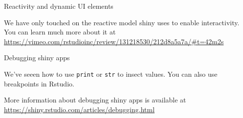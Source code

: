 \documentclass[
  12pt,
  ignorenonframetext,
]{beamer}
\begin{document}
\begin{frame}{Reactivity and dynamic UI elements}
\protect\hypertarget{reactivity-and-dynamic-ui-elements}{}

We have only touched on the reactive model shiny uses to enable
interactivity. You can learn much more about it at
\url{https://vimeo.com/rstudioinc/review/131218530/212d8a5a7a/\#t=42m2s}

\end{frame}

\begin{frame}[fragile]{Debugging shiny apps}
\protect\hypertarget{debugging-shiny-apps}{}

We've seeen how to use \texttt{print} or \texttt{str} to insect values.
You can also use breakpoints in Rstudio.

More information about debugging shiny apps is available at
\url{https://shiny.rstudio.com/articles/debugging.html}

\end{frame}
\end{document}
